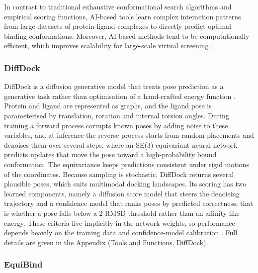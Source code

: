 In contrast to traditional exhaustive conformational search algorithms and empirical scoring functions, AI-based tools learn complex interaction patterns from large datasets of protein-ligand complexes to directly predict optimal binding conformations. Moreover, AI-based methods tend to be computationally efficient, which improves scalability for large-scale virtual screening \cite{ref051}.

\hypertarget{diffdock}{%
\subsubsection{DiffDock}\label{diffdock}}

DiffDock is a diffusion generative model that treats pose prediction as a generative task rather than optimisation of a hand-crafted energy function \cite{ref024}. Protein and ligand are represented as graphs, and the ligand pose is parameterised by translation, rotation and internal torsion angles. During training a forward process corrupts known poses by adding noise to these variables, and at inference the reverse process starts from random placements and denoises them over several steps, where an SE(3)-equivariant neural network predicts updates that move the pose toward a high-probability bound conformation. The equivariance keeps predictions consistent under rigid motions of the coordinates. Because sampling is stochastic, DiffDock returns several plausible poses, which suits multimodal docking landscapes. Its scoring has two learned components, namely a diffusion score model that steers the denoising trajectory and a confidence model that ranks poses by predicted correctness, that is whether a pose falls below a 2\angstrom{} RMSD threshold rather than an affinity-like energy. These criteria live implicitly in the network weights, so performance depends heavily on the training data and confidence-model calibration \cite{ref024}. Full details are given in the Appendix (Tools and Functions, DiffDock).

\hypertarget{equibind}{%
\subsubsection{EquiBind}\label{equibind}}

